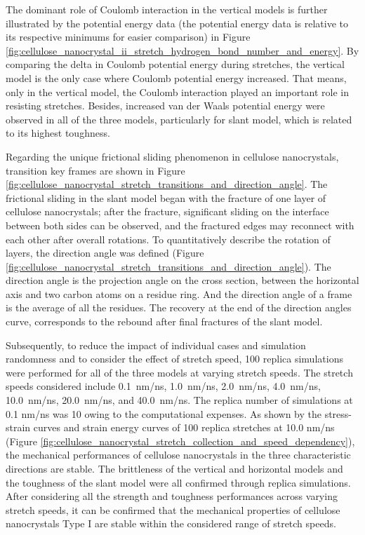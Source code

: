 \documentclass{article}
\begin{document}
The dominant role of Coulomb interaction in the vertical models is further illustrated by the potential energy data (the potential energy data is relative to its respective minimums for easier comparison) in Figure \ref{fig:cellulose_nanocrystal_ii_stretch_hydrogen_bond_number_and_energy}.
By comparing the delta in Coulomb potential energy during stretches, the vertical model is the only case where Coulomb potential energy increased.
That means, only in the vertical model, the Coulomb interaction played an important role in resisting stretches.
Besides, increased van der Waals potential energy were observed in all of the three models, particularly for slant model, which is related to its highest toughness.

Regarding the unique frictional sliding phenomenon in cellulose nanocrystals, transition key frames are shown in Figure \ref{fig:cellulose_nanocrystal_stretch_transitions_and_direction_angle}.
The frictional sliding in the slant model began with the fracture of one layer of cellulose nanocrystals; after the fracture, significant sliding on the interface between both sides can be observed, and the fractured edges may reconnect with each other after overall rotations.
To quantitatively describe the rotation of layers, the direction angle was defined (Figure \ref{fig:cellulose_nanocrystal_stretch_transitions_and_direction_angle}).
The direction angle is the projection angle on the cross section, between the horizontal axis and two carbon atoms on a residue ring.
And the direction angle of a frame is the average of all the residues.
The recovery at the end of the direction angles curve, corresponds to the rebound after final fractures of the slant model.

Subsequently, to reduce the impact of individual cases and simulation randomness and to consider the effect of stretch speed, 100 replica simulations were performed for all of the three models at varying stretch speeds.
The stretch speeds considered include 0.1~nm/ns, 1.0~nm/ns, 2.0~nm/ns, 4.0~nm/ns, 10.0~nm/ns, 20.0~nm/ns, and 40.0~nm/ns.
The replica number of simulations at 0.1 nm/ns was 10 owing to the computational expenses.
As shown by the stress-strain curves and strain energy curves of 100 replica stretches at 10.0 nm/ns (Figure \ref{fig:cellulose_nanocrystal_stretch_collection_and_speed_dependency}), the mechanical performances of cellulose nanocrystals in the three characteristic directions are stable.
The brittleness of the vertical and horizontal models and the toughness of the slant model were all confirmed through replica simulations.
After considering all the strength and toughness performances across varying stretch speeds, it can be confirmed that the mechanical properties of cellulose nanocrystals Type I are stable within the considered range of stretch speeds.
\end{document}
